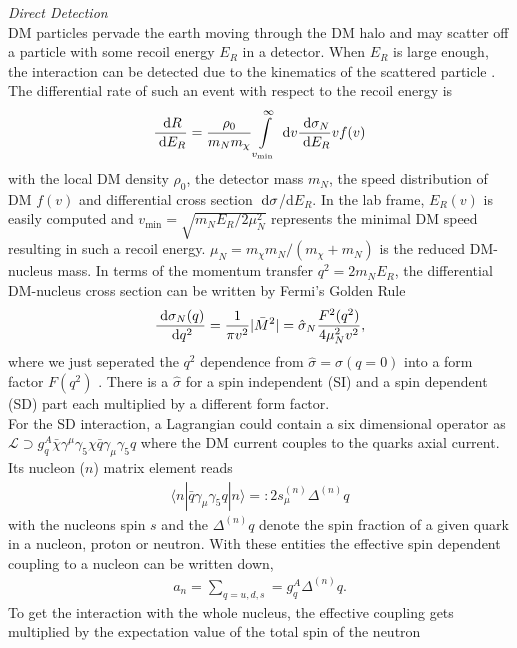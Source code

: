 \textit{Direct Detection} \\
DM particles pervade the earth moving through the DM halo and may scatter off a particle 
with some recoil energy $E_R$ in a detector. When $E_R$ is large enough, the interaction can be detected due to
the kinematics of the scattered particle \cite{GoodmanWitten}. The differential rate of such an event with respect to the recoil energy is
\cite{1002.1912}
\begin{align}
 \frac{\; \mathrm{d} R}{\; \mathrm{d} E_R} = \frac{\rho_0}{m_N m_\chi}\int\limits_{v_\text{min}}^\infty \; \mathrm{d} v \frac{\; \mathrm{d} \sigma_N}{\; \mathrm{d} E_R} v f(v)
\end{align}
with the local DM density $\rho_0$, the detector mass $m_N$, the speed distribution of DM $f(v)$ \cite{1312.0273} and differential cross section $\; \mathrm{d}\sigma$/d$E_R$.
In the lab frame, $E_R(v)$ is easily computed and $v_\text{min} =\sqrt{m_NE_R/2\mu^2_N}$ represents the minimal DM speed resulting in such a recoil 
energy. $\mu_N = m_\chi m_N /(m_\chi+m_N)$ is the reduced DM-nucleus mass. In terms of the momentum transfer $q^2=2m_NE_R$, the differential
DM-nucleus cross section can be written by Fermi's Golden Rule 
\begin{align}
 \frac{\; \mathrm{d} \sigma_N(q)}{\; \mathrm{d} q^2} = \frac{1}{\pi v^2} |\bar{M}^2| = \hat{\sigma}_N \frac{F^2(q^2)}{4\mu_N^2 v^2},
\end{align}
where we just seperated the $q^2$ dependence from $\hat{\sigma} = \sigma(q=0)$ into a form factor $F(q^2)$ \cite{0608035}. There is a 
$\hat{\sigma}$ for a spin independent (SI) and a spin dependent (SD) part each multiplied by a different form factor. \\
\noindent For the SD interaction,
a Lagrangian could contain a six dimensional operator as $\mathcal{L} \supset g_q^A\bar \chi \gamma^\mu\gamma_5 \chi \bar q \gamma_\mu\gamma_5 q$
where the DM current couples to the quarks axial current. Its nucleon ($n$) matrix element reads
\begin{align}
 \langle n |\bar q \gamma_\mu \gamma_5 q|n\rangle =: 2 s_\mu^{(n)} \Delta^{(n)} q
\end{align}
with the nucleons spin $s$ and the $\Delta^{(n)}q$ denote the spin fraction of a given quark in a nucleon, proton or neutron. With these entities
the effective spin dependent coupling to a nucleon can be written down,
\begin{align}
 a_n = \sum\limits_{q=u,d,s} = g_q^A \Delta^{(n)}q.
\end{align}
To get the interaction with the whole nucleus, the effective coupling gets multiplied by the expectation value of the total spin of the neutron
